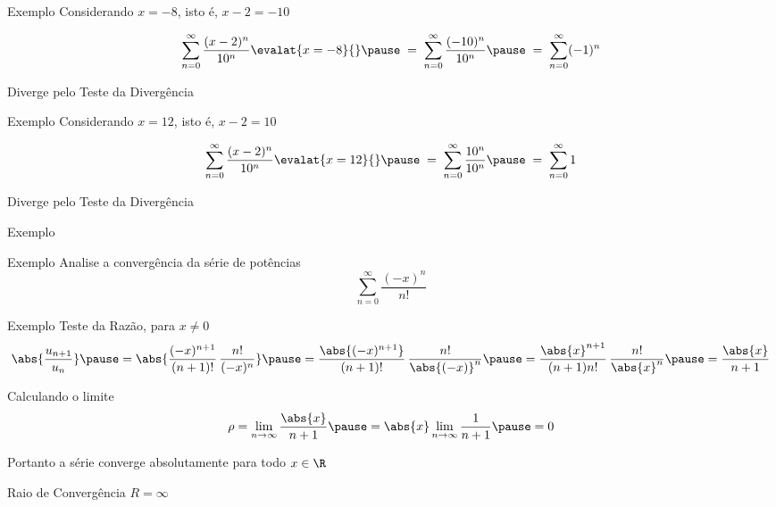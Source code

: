 \begin{frame}{Exemplo \theexemplo}
  Considerando \(x = -8\), isto é, \(x-2=-10\)

  \pause
  \vspace{\baselineskip}\[
    \sum_{n=0}^\infty \frac{(x-2)^n}{10^n} \evalat{x=-8}{} \pause \;=\;
    \sum_{n=0}^\infty \frac{(-10)^n}{10^n} \pause \;=\;
    \sum_{n=0}^\infty (-1)^n
  \]

  \pause
  \vspace{\baselineskip}
  Diverge pelo Teste da Divergência
\end{frame}

\begin{frame}{Exemplo \theexemplo}
  Considerando \(x = 12\), isto é, \(x-2=10\)

  \pause
  \vspace{\baselineskip}
  \[
    \sum_{n=0}^\infty \frac{(x-2)^n}{10^n} \evalat{x=12}{} \pause \;=\;
    \sum_{n=0}^\infty \frac{10^n}{10^n}    \pause \;=\;
    \sum_{n=0}^\infty 1
  \]

  \pause
  \vspace{\baselineskip}
  Diverge pelo Teste da Divergência
\end{frame}

\begin{frame}{Exemplo \theexemplo}
\end{frame}

\addtocounter{exemplo}{1}
\begin{frame}{Exemplo \theexemplo}
  Analise a convergência da série de potências
  \[
    \sum_{n=0}^\infty \frac{(-x)^n}{n!}
  \]
\end{frame}

\begin{frame}{Exemplo \theexemplo}
  Teste da Razão, para \(x \neq 0\)
  \pause
  \[
    \abs{\frac{u_{n+1}}{u_n}}                                \pause =
    \abs{\frac{(-x)^{n+1}}{(n+1)!}\,\frac{n!}{(-x)^n}}       \pause =
    \frac{\abs{(-x)^{n+1}}}{(n+1)!}\,\frac{n!}{\abs{(-x)}^n} \pause =
    \frac{\abs{x}^{n+1}}{(n+1)n!}\,\frac{n!}{\abs{x}^n}      \pause =
    \frac{\abs{x}}{n+1}
  \]

  \pause
  Calculando o limite
  \[
    \rho
    = \lim_{n\to\infty} \frac{\abs{x}}{n+1}
    \pause
    = \abs{x} \lim_{n\to\infty} \frac{1}{n+1}
    \pause
    = 0
  \]

  \pause
  Portanto a série converge absolutamente para todo \(x\in\R\)

  \pause
  \vspace{0.5\baselineskip}
  Raio de Convergência \(R = \infty\)
\end{frame}

